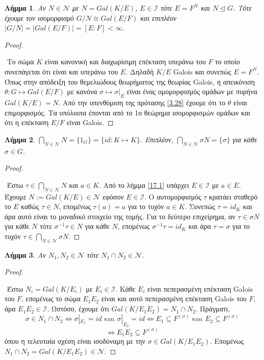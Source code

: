 \documentclass[oneside,a4paper]{article}
\newtheorem{lemma}{Λήμμα}
\newcommand {\tl}{\textlatin}
\begin{document}
\begin{lemma} \label{17.2} Αν $N \in \mathcal{N}$ με $N = Gal(K/E)$, $E \in \mathcal{I}$ τότε $E=F^N$ και $N\unlhd G$. Τότε έχουμε τον ισομορφισμό $G/N \cong Gal(E/F)$ και επιπλέον $|G/N| = |Gal(E/F)| = [E:F] < \infty$.
\end{lemma}  
\begin{proof} $ $
 
$ $\newline
Το σώμα $K$ είναι κανονική και διαχωρίσιμη επέκταση υπεράνω του $F$ το οποίο συνεπάγεται ότι είναι και υπεράνω του $E$. Δηλαδή $K/E$ \tl{Galois} και συνεπώς $E = F^N$. Όπως στην απόδειξη του θεμελιώδους θεωρήματος της θεωρίας \tl{Galois}, η απεικόνιση $\theta : G \mapsto Gal(E/F)$ με κανόνα $\sigma \mapsto \sigma|_E$ είναι ένας ομομορφισμός ομάδων με πυρήνα $Gal(K/E) = N$. Από την υπενθύμιση της πρότασης \ref{3.28} έχουμε ότι το $\theta$ είναι επιμορφισμός. Τα υπόλοιπα έπονται από το 1ο θεώρημα ισομορφισμών ομάδων και ότι η επέκταση $E/F$ είναι \tl{Galois}.
\end{proof}

\begin{lemma} \label{17.3}  $\bigcap_{N \in \mathcal{N}} N= \{1_G \} = \{ id: K \mapsto K \}$. Επιπλέον, $\bigcap_{N \in \mathcal{N}} \sigma N = \{\sigma \}$ για κάθε $\sigma \in G$.
\end{lemma}
\begin{proof} $ $

$ $\newline	
Έστω $\tau \in \bigcap_{N \in \mathcal{N}} N$ και $a \in K$. Από το λήμμα \ref{17.1} υπάρχει  $E \in \mathcal{I}$ με $a \in E$. Έχουμε $N := Gal(K/E) \in \mathcal{N}$ εφόσον $E \in \mathcal{I}$. Ο αυτομορφισμός $\tau$ κρατάει σταθερό το $E$ καθώς $\tau \in N$, επομένως $\tau (a) = a$ για το τυχόν $a \in K$. Συνεπώς $\tau = id_K$ και άρα αυτό είναι το μοναδικό στοιχείο της τομής. Για το δεύτερο επιχείρημα, αν $\tau \in \sigma N$ για κάθε $N$ τότε $\sigma^{-1} \tau \in N$ για κάθε $N$, επομένως $\sigma^{-1} \tau = id_K$ και άρα $\tau = \sigma$ για το τυχόν $\tau \in \bigcap_{N \in \mathcal{N}} \sigma N$.
\end{proof}

\begin{lemma} \label{17.4} Αν $N_1 , N_2 \in \mathcal{N}$ τότε $N_1 \cap N_2 \in \mathcal{N}$.
\end{lemma}
\begin{proof} $ $

$ $\newline
Έστω $N_i = Gal(K/E_i)$ με $E_i \in \mathcal{I}$. Κάθε $E_i$ είναι πεπερασμένη επέκταση \tl{Galois} του $F$, επομένως το σώμα $E_1 E_2$ είναι και αυτό πεπερασμένη επέκταση \tl{Galois} του $F$, άρα $E_1 E_2 \in \mathcal{I}$. Ωστόσο, έχουμε ότι $Gal(K/E_1 E_2) = N_1 \cap N_2$. Πράγματι,
$$\sigma \in N_1 \cap N_2 \iff \sigma|_{E_1} = id \text{ και } \sigma|_{E_2}=id \iff E_1 \subseteq F^{(\sigma)} \text{ και } E_2 \subseteq F^{(\sigma)}$$
$$\iff E_1 E_2 \subseteq F^{(\sigma)}$$
όπου η τελευταία σχέση είναι ισοδύναμη με την $\sigma \in Gal(K/E_1 E_2)$. Επομένως $N_1 \cap N_2 = Gal(K/E_1 E_2) \in \mathcal{N}$.
\end{proof}
\end{document}

